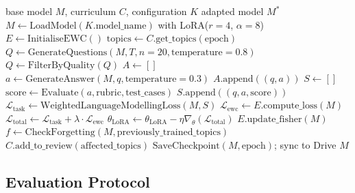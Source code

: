 \documentclass[12pt,a4paper]{report}
\begin{document}
\begin{algorithm}[htbp]
\caption{SEAL Training Loop}
\begin{algorithmic}[1]
\Require base model $M$, curriculum $C$, configuration $K$
\Ensure adapted model $M^*$
\State $M \gets \text{LoadModel}(K.\text{model\_name})$ with LoRA($r=4$, $\alpha=8$)
\State $E \gets \text{InitialiseEWC}()$
    \State $\text{topics} \gets C.\text{get\_topics}(\text{epoch})$
        \State $Q \gets \text{GenerateQuestions}(M, T, n=20, \text{temperature}=0.8)$
        \State $Q \gets \text{FilterByQuality}(Q)$
        \State $A \gets []$
            \State $a \gets \text{GenerateAnswer}(M, q, \text{temperature}=0.3)$
            \State $A.\text{append}((q, a))$
        \EndFor
        \State $S \gets []$
            \State $\text{score} \gets \text{Evaluate}(a, \text{rubric}, \text{test\_cases})$
            \State $S.\text{append}((q, a, \text{score}))$
        \EndFor
        \State $\mathcal{L}_{\text{task}} \gets \text{WeightedLanguageModellingLoss}(M, S)$
        \State $\mathcal{L}_{\text{ewc}} \gets E.\text{compute\_loss}(M)$
        \State $\mathcal{L}_{\text{total}} \gets \mathcal{L}_{\text{task}} + \lambda \cdot \mathcal{L}_{\text{ewc}}$
        \State $\theta_{\text{LoRA}} \gets \theta_{\text{LoRA}} - \eta \nabla_{\theta} (\mathcal{L}_{\text{total}})$
    \EndFor
    \State $E.\text{update\_fisher}(M)$
    \State $f \gets \text{CheckForgetting}(M, \text{previously\_trained\_topics})$
        \State $C.\text{add\_to\_review}(\text{affected\_topics})$
    \EndIf
    \State $\text{SaveCheckpoint}(M, \text{epoch})$; sync to Drive
\EndFor
\State \Return $M$
\end{algorithmic}
\end{algorithm}

\subsection{Evaluation Protocol}
\end{document}
